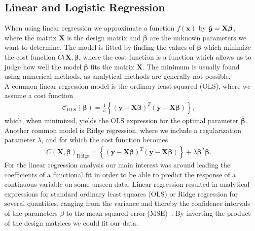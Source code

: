 \documentclass[english,notitlepage,reprint,nofootinbib]{revtex4–2}  %
\begin{document}
\subsection*{Linear and Logistic Regression}
When using linear regression we approximate a function $f(\boldsymbol{x})$ by $\Tilde{\boldsymbol{y}} = \mathbf{X}\boldsymbol{\beta}$, where the matrix $\mathbf{X}$ is the design matrix and $\boldsymbol{\beta}$ are the unknown parameters we want to determine. 
The model is fitted by finding the values of $\boldsymbol{\beta}$ which minimize the cost function $C(\mathbf{X}, \boldsymbol{\beta}$, where the cost function is a function which allows us to judge how well the model $\boldsymbol{\beta}$ fits the matrix $\mathbf{X}$. The minimum is usually found using numerical methods, as analytical methods are generally not possible. 
\vspace{3mm}
\\
A common linear regression model is the ordinary least squared (OLS), where we assume a cost function 
\begin{align}\label{eq: costfunc_OLS}
    \mathcal{C}_\text{OLS}(\boldsymbol{\beta}) = \frac{1}{n}\left\{(\boldsymbol{y} - \mathbf{X}\boldsymbol{\beta})^T (\boldsymbol{y} - \mathbf{X}\boldsymbol{\beta})\right\},
\end{align}
which, when minimized, yields the OLS expression for the optimal parameter $\hat{\boldsymbol{\beta}}$. 
Another common model is Ridge regression, where we include a regularization parameter $\lambda$, and for which the cost function becomes 
\begin{align}\label{eq: costfunc_ridge}
    C(\mathbf{X},\boldsymbol{\beta})_\text{Ridge} = \left\{ (\boldsymbol{y} - \mathbf{X}\boldsymbol{\beta})^T (\boldsymbol{y} - \mathbf{X}\boldsymbol{\beta}) \right\} + \lambda\boldsymbol{\beta}^T\boldsymbol{\beta}. 
\end{align}
For the linear regression analysis our main interest was around leading the coefficients of a functional fit in order to be able to predict the response of a continuous variable on some unseen data. 
Linear regression resulted in analytical expressions for standard ordinary least squares (OLS) or Ridge regression for several quantities, ranging from the variance and thereby the confidence intervals of the parameters $\beta$ to the mean squared error (MSE)~\cite{lecture_notes}. By inverting the product of the design matrices we could fit our data. 
\end{document}
